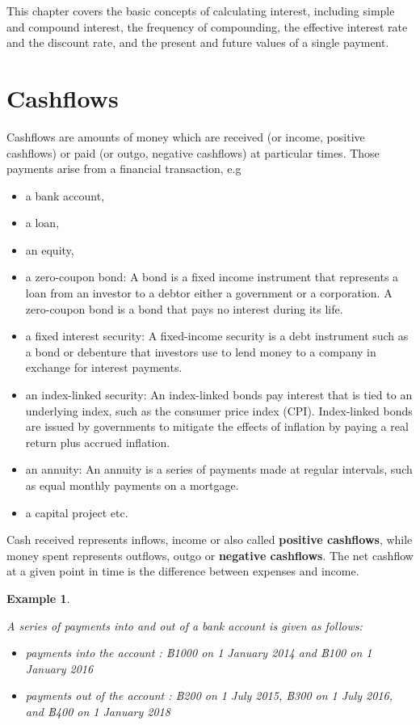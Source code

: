 \documentclass[landscape, 20pt]{extreport}
\theoremstyle{definition}
\theoremstyle{definition}
\newtheorem{example}{Example}[chapter]
\theoremstyle{definition}
\theoremstyle{definition}
\theoremstyle{remark}
\begin{document}
This chapter covers the basic concepts of calculating interest,
including simple and compound interest, the frequency of compounding,
the effective interest rate and the discount rate, and the present and
future values of a single payment.

\hypertarget{cashflows}{%
\newpage \section{Cashflows}\label{cashflows}}

Cashflows are amounts of money which are received (or income, positive
cashflows) or paid (or outgo, negative cashflows) at particular times.
Those payments arise from a financial transaction, e.g

\begin{itemize}
\item
  a bank account,
\item
  a loan,
\item
  an equity,
\item
  a zero-coupon bond: A bond is a fixed income instrument that
  represents a loan from an investor to a debtor either a government
  or a corporation. A zero-coupon bond is a bond that pays no interest
  during its life.
\item
  a fixed interest security: A fixed-income security is a debt
  instrument such as a bond or debenture that investors use to lend
  money to a company in exchange for interest payments.
\item
  an index-linked security: An index-linked bonds pay interest that is
  tied to an underlying index, such as the consumer price index (CPI).
  Index-linked bonds are issued by governments to mitigate the effects
  of inflation by paying a real return plus accrued inflation.
\item
  an annuity: An annuity is a series of payments made at regular
  intervals, such as equal monthly payments on a mortgage.
\item
  a capital project etc.
\end{itemize}

Cash received represents inflows, income or also called \textbf{positive
cashflows}, while money spent represents outflows, outgo or \textbf{negative
cashflows}. The net cashflow at a given point in time is the difference
between expenses and income.

\newpage \begin{example}
\protect\hypertarget{exm:unlabeled-div-1}{}\label{exm:unlabeled-div-1}

\emph{A series of payments into and out of a bank account is given as
follows:}

\begin{itemize}
\item
  \emph{payments into the account : ฿1000 on 1 January 2014 and ฿100 on 1
  January 2016}
\item
  \emph{payments out of the account : ฿200 on 1 July 2015, ฿300 on 1 July
  2016, and ฿400 on 1 January 2018}
\end{itemize}

\end{example}
\end{document}

